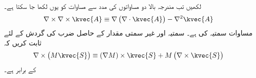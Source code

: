 لکھیں تب مندرجہ بالا دو مساواتوں کی مدد سے مساوات  کو یوں لکھا جا سکتا ہے۔
\begin{align}\label{مساوات_مقناطیسی_گردش_کی_گردش_ب}
\nabla \times \nabla \times \kvec{A} \equiv \nabla \left(\nabla \cdot \kvec{A} \right)-\nabla^2 \kvec{A}
\end{align}
مساوات  سمتیہ کی  ہے۔
سمتیہ  اور غیر سمتی مقدار  کے حاصل ضرب کی گردش کے لئے ثابت کریں کہ
\begin{align}
\nabla \times \left(M\kvec{S}\right) \equiv \left(\nabla M\right) \times \kvec{S}+M \left(\nabla \times \kvec{S}\right)
\end{align}
کے برابر ہے۔

